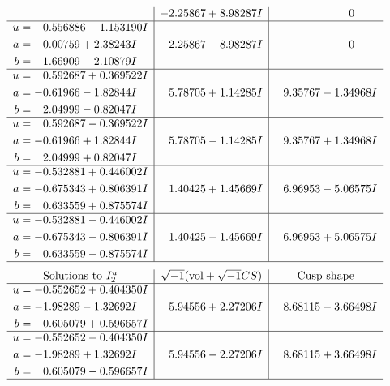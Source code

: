 \documentclass[1p]{elsarticle_modified}
\theoremstyle{definition}
\newcommand{\I}{\sqrt{-1}}
\begin{document}
$$\begin{array}{c|c|c}
 & -2.25867 + 8.98287 I & \phantom{-0.000000 } 0 \\ \hline\begin{aligned}
u &= \phantom{-}0.556886 - 1.153190 I \\
a &= \phantom{-}0.00759 + 2.38243 I \\
b &= \phantom{-}1.66909 - 2.10879 I\end{aligned}
 & -2.25867 - 8.98287 I & \phantom{-0.000000 } 0 \\ \hline\begin{aligned}
u &= \phantom{-}0.592687 + 0.369522 I \\
a &= -0.61966 - 1.82844 I \\
b &= \phantom{-}2.04999 - 0.82047 I\end{aligned}
 & \phantom{-}5.78705 + 1.14285 I & \phantom{-}9.35767 - 1.34968 I \\ \hline\begin{aligned}
u &= \phantom{-}0.592687 - 0.369522 I \\
a &= -0.61966 + 1.82844 I \\
b &= \phantom{-}2.04999 + 0.82047 I\end{aligned}
 & \phantom{-}5.78705 - 1.14285 I & \phantom{-}9.35767 + 1.34968 I \\ \hline\begin{aligned}
u &= -0.532881 + 0.446002 I \\
a &= -0.675343 + 0.806391 I \\
b &= \phantom{-}0.633559 + 0.875574 I\end{aligned}
 & \phantom{-}1.40425 + 1.45669 I & \phantom{-}6.96953 - 5.06575 I \\ \hline\begin{aligned}
u &= -0.532881 - 0.446002 I \\
a &= -0.675343 - 0.806391 I \\
b &= \phantom{-}0.633559 - 0.875574 I\end{aligned}
 & \phantom{-}1.40425 - 1.45669 I & \phantom{-}6.96953 + 5.06575 I\\
 \hline 
 \end{array}$$\newpage$$\begin{array}{c|c|c}  
\text{Solutions to }I^u_{2}& \I (\text{vol} + \sqrt{-1}CS) & \text{Cusp shape}\\
 \hline 
\begin{aligned}
u &= -0.552652 + 0.404350 I \\
a &= -1.98289 - 1.32692 I \\
b &= \phantom{-}0.605079 + 0.596657 I\end{aligned}
 & \phantom{-}5.94556 + 2.27206 I & \phantom{-}8.68115 - 3.66498 I \\ \hline\begin{aligned}
u &= -0.552652 - 0.404350 I \\
a &= -1.98289 + 1.32692 I \\
b &= \phantom{-}0.605079 - 0.596657 I\end{aligned}
 & \phantom{-}5.94556 - 2.27206 I & \phantom{-}8.68115 + 3.66498 I\\
 \hline 
 \end{array}$$\newpage\newpage\renewcommand{\arraystretch}{1}
\end{document}
